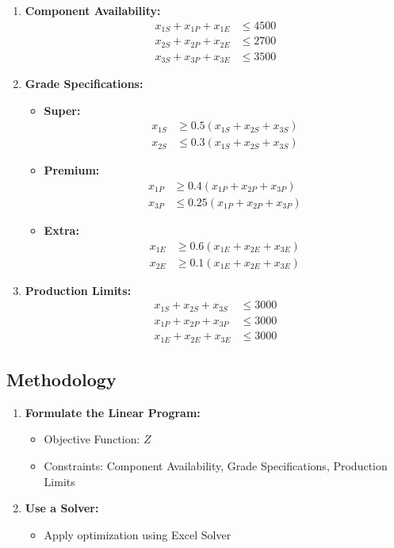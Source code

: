 \documentclass[10pt]{article}
\begin{document}
\begin{enumerate}
    \item \textbf{Component Availability:}
    \begin{align*}
    x_{1S} + x_{1P} + x_{1E} &\leq 4500 \\
    x_{2S} + x_{2P} + x_{2E} &\leq 2700 \\
    x_{3S} + x_{3P} + x_{3E} &\leq 3500
    \end{align*}
    
    \item \textbf{Grade Specifications:}
    \begin{itemize}
        \item \textbf{Super:}
        \begin{align*}
        x_{1S} &\geq 0.5(x_{1S} + x_{2S} + x_{3S}) \\
        x_{2S} &\leq 0.3(x_{1S} + x_{2S} + x_{3S})
        \end{align*}
        \item \textbf{Premium:}
        \begin{align*}
        x_{1P} &\geq 0.4(x_{1P} + x_{2P} + x_{3P}) \\
        x_{3P} &\leq 0.25(x_{1P} + x_{2P} + x_{3P})
        \end{align*}
        \item \textbf{Extra:}
        \begin{align*}
        x_{1E} &\geq 0.6(x_{1E} + x_{2E} + x_{3E}) \\
        x_{2E} &\geq 0.1(x_{1E} + x_{2E} + x_{3E})
        \end{align*}
    \end{itemize}
    
    \item \textbf{Production Limits:}
    \begin{align*}
    x_{1S} + x_{2S} + x_{3S} &\leq 3000 \\
    x_{1P} + x_{2P} + x_{3P} &\leq 3000 \\
    x_{1E} + x_{2E} + x_{3E} &\leq 3000
    \end{align*}
\end{enumerate}

\subsection*{Methodology}

\begin{enumerate}
    \item \textbf{Formulate the Linear Program:}
    \begin{itemize}
        \item Objective Function: \( Z \)
        \item Constraints: Component Availability, Grade Specifications, Production Limits
    \end{itemize}
    
    \item \textbf{Use a Solver:}
    \begin{itemize}
        \item Apply optimization using Excel Solver
    \end{itemize}
\end{enumerate}
\end{document}
